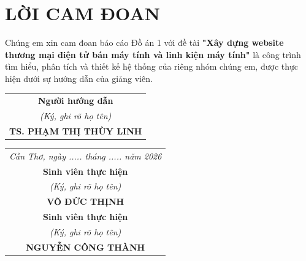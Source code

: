 \chapter*{LỜI CAM ĐOAN}
\vspace{-15pt} %
Chúng em xin cam đoan báo cáo Đồ án 1 với đề tài \textbf{"Xây dựng website thương mại điện tử bán máy tính và linh kiện máy tính"} là công trình tìm hiểu, phân tích và thiết kế hệ thống của riêng nhóm chúng em, được thực hiện dưới sự hướng dẫn của giảng viên.

\vfill %

\noindent %
\begin{tabular}{@{}c@{}}
    \textbf{Người hướng dẫn}\\
    \textit{(Ký, ghi rõ họ tên)} \\[2cm] %
    \textbf{TS. PHẠM THỊ THÙY LINH}
\end{tabular}
\hfill %
\begin{tabular}{@{}c@{}}
    \textit{Cần Thơ, ngày ..... tháng ..... năm 2026} \\[0.2cm]
    \textbf{Sinh viên thực hiện}\\
    \textit{(Ký, ghi rõ họ tên)} \\[2cm]
    \textbf{VÕ ĐỨC THỊNH} \\[2cm]
    \textbf{Sinh viên thực hiện}\\
    \textit{(Ký, ghi rõ họ tên)} \\[2cm]
    \textbf{NGUYỄN CÔNG THÀNH}
\end{tabular}